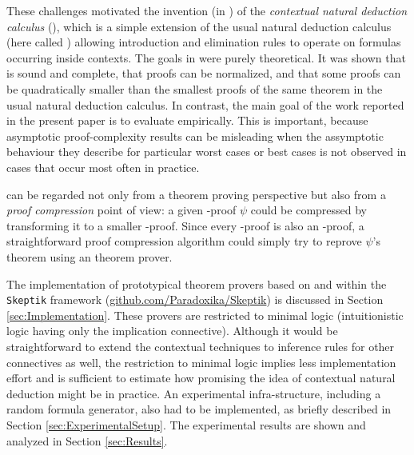 \documentclass{llncs}
\newcommand{\Skeptik}{\texttt{Skeptik}\xspace}
\begin{document}
These challenges motivated the invention (in \cite{NDc}) of the \emph{contextual natural deduction calculus} (\NDd), which is a simple extension of the usual natural deduction calculus (here called {\ND}) allowing introduction and elimination rules to operate on formulas occurring inside contexts. The goals in \cite{NDc} were purely theoretical. It was shown that {\NDd} is sound and complete, that proofs can be normalized, and that some proofs can be quadratically smaller than the smallest proofs of the same theorem in the usual natural deduction calculus. In contrast, the main goal of the work reported in the present paper is to evaluate {\NDd} empirically. This is important, because asymptotic proof-complexity results can be misleading when the assymptotic behaviour they describe for particular worst cases or best cases is not observed in cases that occur most often in practice.

{\NDd} can be regarded not only from a theorem proving perspective but also from a \emph{proof compression} point of view: a given {\ND}-proof $\psi$ could be compressed by transforming it to a smaller {\NDd}-proof. Since every {\ND}-proof is also an {\NDd}-proof, a straightforward proof compression algorithm could simply try to reprove $\psi$'s theorem using an {\NDd} theorem prover.

The implementation of prototypical theorem provers based on {\ND} and {\NDd} within the {\Skeptik} framework (\url{github.com/Paradoxika/Skeptik}) %
is discussed in Section \ref{sec:Implementation}. These provers are restricted to minimal logic (intuitionistic logic having only the implication connective). Although it would be straightforward to extend the contextual techniques to inference rules for other connectives as well, the restriction to minimal logic implies less implementation effort and is sufficient to estimate how promising the idea of contextual natural deduction might be in practice. An experimental infra-structure, including a random formula generator, also had to be implemented, as briefly described in Section \ref{sec:ExperimentalSetup}. The experimental results are shown and analyzed in Section \ref{sec:Results}.


\medskip
\end{document}
